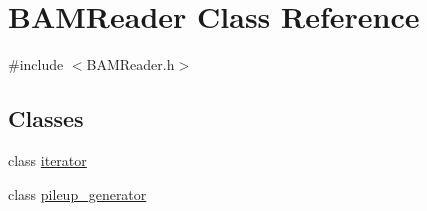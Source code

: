 \hypertarget{class_b_a_m_reader}{
\section{BAMReader Class Reference}
\label{class_b_a_m_reader}
}


{\ttfamily \#include $<$BAMReader.h$>$}

\subsection*{Classes}
\begin{DoxyCompactItemize}
\item 
class \hyperlink{class_b_a_m_reader_1_1iterator}{iterator}
\item 
class \hyperlink{class_b_a_m_reader_1_1pileup__generator}{pileup\_\-generator}
\end{DoxyCompactItemize}
